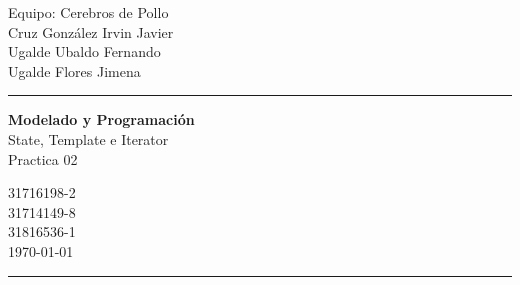 \documentclass[a4paper,10pt]{article}
\begin{document}
\fancyhead[C]{}
\begin{minipage}{0.295\textwidth} 
\raggedright
Equipo: Cerebros de Pollo\\    
\footnotesize 
\colorbox[rgb]{0.67, 0.88, 0.69}{Cruz González Irvin Javier}
\\\colorbox[rgb]{0.06, 0.75, 0.99 }{Ugalde Ubaldo Fernando}
\\\colorbox[rgb]{0.96, 0.76, 0.76}{Ugalde Flores Jimena}

\textcolor[rgb]{0.0, 0.72, 0.92}{\medskip\hrule}
\end{minipage}
\begin{minipage}{0.4\textwidth} 
\centering 
\large 
\textbf{Modelado y Programación}\\ 
\normalsize 
State, Template e Iterator \\Practica 02\\
\end{minipage}
\begin{minipage}{0.295\textwidth} 
\raggedleft
\footnotesize
\colorbox[rgb]{0.67, 0.88, 0.69}{31716198-2}\\
\colorbox[rgb]{0.06, 0.75, 0.99 }{31714149-8}\\
\colorbox[rgb]{0.96, 0.76, 0.76}{31816536-1}\\
\today
\textcolor[rgb]{0.0, 0.72, 0.92}{\medskip\hrule}
\end{minipage}
\end{document}
